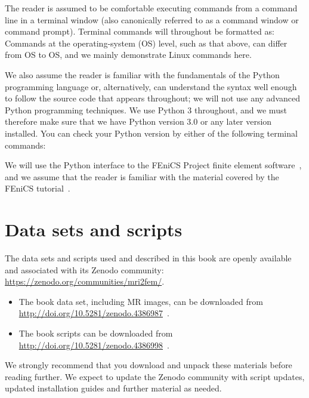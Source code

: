 The reader is assumed to be comfortable executing commands from a
command line in a terminal window (also canonically referred
to as a command window or command prompt). Terminal commands
will throughout be formatted as:
\noindent Commands at the operating-system (OS) level, such as that above,
can differ from OS to OS, and we mainly demonstrate Linux commands
here.

We also assume the reader is familiar with the fundamentals of the
Python programming language or, alternatively, can understand the
syntax well enough to follow the source code that appears throughout;
we will not use any advanced Python programming techniques. We use
Python 3 throughout, and we must therefore make sure that we have Python
version 3.0 or any later version installed. You can check
your Python version by either of the following terminal commands:

We will use the Python interface to the FEniCS Project finite
element software~\cite{alnaes2015fenics}, and we assume that the
reader is familiar with the material covered by the FEniCS
tutorial~\cite{langtangen2016solving}.

\section{Data sets and scripts}


The data sets and scripts used and described in this book are openly
available and associated with its Zenodo community:
\url{https://zenodo.org/communities/mri2fem/}. 
\begin{itemize}
\item
  The book data set, including MR images, can be downloaded from \\
  \url{http://doi.org/10.5281/zenodo.4386987}~\cite{kent_andre_mardal_2020_4386987}.
\item
  The book scripts can be downloaded from \\
  \url{http://doi.org/10.5281/zenodo.4386998}~\cite{kent_andre_mardal_2020_4386999}.
\end{itemize}
We strongly recommend that you download and unpack these materials
before reading further. We expect to update the Zenodo community with
script updates, updated installation guides and further material as
needed.
 
